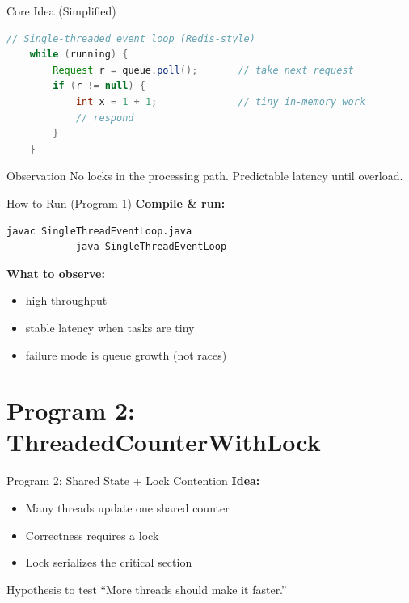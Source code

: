 \documentclass[11pt]{beamer}
\begin{document}
	\begin{frame}[fragile]{Core Idea (Simplified)}
		\begin{lstlisting}[language=Java]
	// Single-threaded event loop (Redis-style)
	while (running) {
		Request r = queue.poll();       // take next request
		if (r != null) {
			int x = 1 + 1;              // tiny in-memory work
			// respond
		}
	}
		\end{lstlisting}

		
		\begin{block}{Observation}
			No locks in the processing path. Predictable latency until overload.
		\end{block}
	\end{frame}
	
	\begin{frame}[fragile]{How to Run (Program 1)}
		\textbf{Compile \& run:}
		\begin{lstlisting}[language=bash]
			javac SingleThreadEventLoop.java
			java SingleThreadEventLoop
		\end{lstlisting}

		
		\textbf{What to observe:}
		\begin{itemize}
			\item high throughput
			\item stable latency when tasks are tiny
			\item failure mode is queue growth (not races)
		\end{itemize}
	\end{frame}
	
	\section{Program 2: ThreadedCounterWithLock}
	
	\begin{frame}{Program 2: Shared State + Lock Contention}
		\textbf{Idea:}
		\begin{itemize}
			\item Many threads update one shared counter
			\item Correctness requires a lock
			\item Lock serializes the critical section
		\end{itemize}

		
		\begin{alertblock}{Hypothesis to test}
			``More threads should make it faster.''
		\end{alertblock}
	\end{frame}
	
\end{document}

